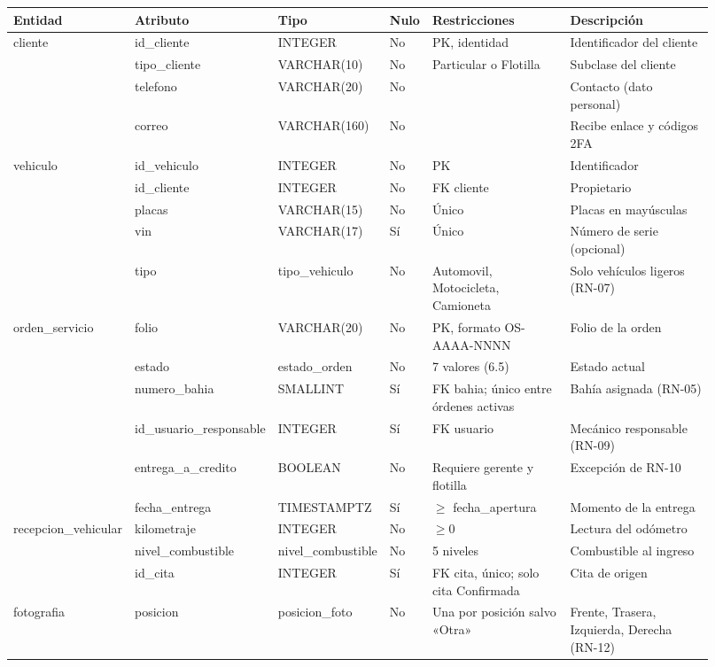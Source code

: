 {\footnotesize
\begin{longtable}{@{}L{0.15\linewidth}L{0.17\linewidth}L{0.13\linewidth}L{0.06\linewidth}L{0.2\linewidth}L{0.21\linewidth}@{}}
\toprule
\textbf{Entidad} & \textbf{Atributo} & \textbf{Tipo} & \textbf{Nulo} & \textbf{Restricciones} & \textbf{Descripción} \\
\midrule
\endhead
\bottomrule
\endlastfoot
cliente & id\_cliente & INTEGER & No & PK, identidad & Identificador del cliente \\
 & tipo\_cliente & VARCHAR(10) & No & Particular o Flotilla & Subclase del cliente \\
 & telefono & VARCHAR(20) & No & & Contacto (dato personal) \\
 & correo & VARCHAR(160) & No & & Recibe enlace y códigos 2FA \\
vehiculo & id\_vehiculo & INTEGER & No & PK & Identificador \\
 & id\_cliente & INTEGER & No & FK cliente & Propietario \\
 & placas & VARCHAR(15) & No & Único & Placas en mayúsculas \\
 & vin & VARCHAR(17) & Sí & Único & Número de serie (opcional) \\
 & tipo & tipo\_vehiculo & No & Automovil, Motocicleta, Camioneta & Solo vehículos ligeros (RN-07) \\
orden\_servicio & folio & VARCHAR(20) & No & PK, formato OS-AAAA-NNNN & Folio de la orden \\
 & estado & estado\_orden & No & 7 valores (6.5) & Estado actual \\
 & numero\_bahia & SMALLINT & Sí & FK bahia; único entre órdenes activas & Bahía asignada (RN-05) \\
 & id\_usuario\_responsable & INTEGER & Sí & FK usuario & Mecánico responsable (RN-09) \\
 & entrega\_a\_credito & BOOLEAN & No & Requiere gerente y flotilla & Excepción de RN-10 \\
 & fecha\_entrega & TIMESTAMPTZ & Sí & $\geq$ fecha\_apertura & Momento de la entrega \\
recepcion\_vehicular & kilometraje & INTEGER & No & $\geq 0$ & Lectura del odómetro \\
 & nivel\_combustible & nivel\_combustible & No & 5 niveles & Combustible al ingreso \\
 & id\_cita & INTEGER & Sí & FK cita, único; solo cita Confirmada & Cita de origen \\
fotografia & posicion & posicion\_foto & No & Una por posición salvo «Otra» & Frente, Trasera, Izquierda, Derecha (RN-12) \\

\end{longtable}}
